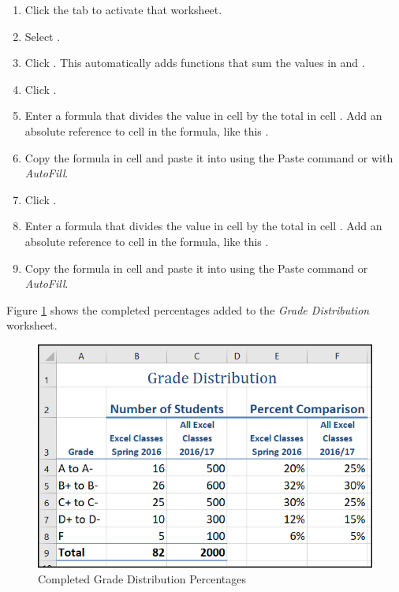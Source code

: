 \begin{enumbox}
	\begin{enumerate}
		\item Click the  tab to activate that worksheet.
		\item Select .
		\item Click . This automatically adds  functions that sum the values in  and .
		\item Click .
		\item Enter a formula that divides the value in cell  by the total in cell . Add an absolute reference to cell  in the formula, like this .
		\item Copy the formula in cell  and paste it into  using the Paste command or with \textit{AutoFill}.
		\item Click .
		\item Enter a formula that divides the value in cell  by the total in cell . Add an absolute reference to cell  in the formula, like this .
		\item Copy the formula in cell  and paste it into  using the Paste command or \textit{AutoFill}.
	\end{enumerate}
\end{enumbox}
	
Figure \ref{04:fig17} shows the completed percentages added to the \textit{Grade Distribution} worksheet.

\begin{figure}[H]
	\centering
	\includegraphics[width=\maxwidth{.95\linewidth}]{gfx/ch04_fig17}
	\caption{Completed Grade Distribution Percentages}
	\label{04:fig17}
\end{figure}

